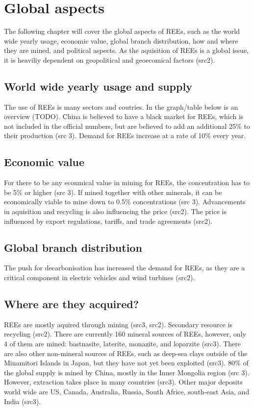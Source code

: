 
\section{Global aspects}

The following chapter will cover the global aspects of REEs, such as the world wide yearly usage, economic value, global branch distribution, how and where they are mined, and political aspects. As the aquisition of REEs is a global issue, it is heaviliy dependent on geopolitical and  geoecomical factors (src2).

\subsection{World wide yearly usage and supply}

The use of REEs is many sectors and coutries. In the graph/table below is an overview (TODO). China is believed to have a black market for REEs, which is not included in the official numbers, but are believed to add an additional 25\% to their production (src 3). Demand for REEs increase at a rate of 10\% every year.

\subsection{Economic value}

For there to be any econmical value in mining for REEs, the concentration has to be 5\% or higher (src 3). If mined together with other minerals, it can be economically viable to mine down to 0.5\% concentrations (src 3). Advancements in aquisition and recycling is also influencing the price (src2). The price is influenced by export regulations, tariffs, and trade agreements (src2).

\subsection{Global branch distribution}

The push for decarbonisation has increased the demand for REEs, as they are a critical component in electric vehicles and wind turbines (src2).

\subsection{Where are they acquired?}

REEs are mostly aquired through mining (src3, src2). Secondary resource is recycling (src2). There are currently 160 mineral sources of REEs, however, only 4 of them are mined: bastnasite, laterite, monazite, and loparzite (src3). There are also other non-mineral sources of REEs, such as deep-sea clays outside of the Minamitori Islands in Japan, but they have not yet been exploited (src3). 80\% of the global supply is mined by China, mostly in the Inner Mongolia region (src 3). However, extraction takes place in many countries (src3). Other major deposits world wide are US, Canada, Australia, Russia, South Africe, south-east Asia, and India (src3).

